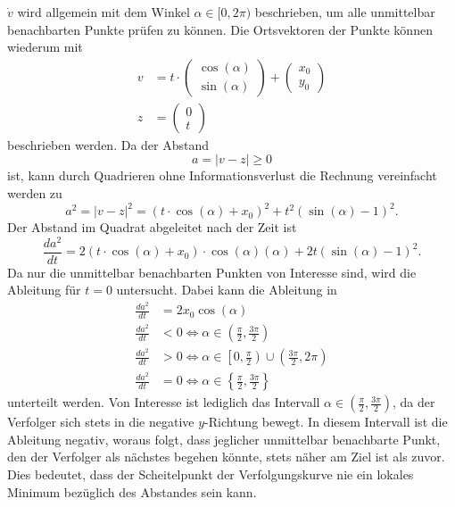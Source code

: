 $\dot{v}$ wird allgemein mit dem Winkel $\alpha \in[ 0, 2\pi)$ beschrieben, um alle unmittelbar benachbarten Punkte prüfen zu können.
Die Ortsvektoren der Punkte können wiederum mit
\begin{align}
	v
	&=
	t\cdot\left(\begin{array}{c} \cos (\alpha) \\ \sin (\alpha) \end{array}\right) +\left(\begin{array}{c} x_0 \\ y_0 \end{array}\right)
	\\
	z
	&=
	\left(\begin{array}{c} 0 \\ t \end{array}\right)
\end{align}
beschrieben werden.
Da der Abstand
\begin{equation}
	a
	=
	|v-z|
	\geq
	0
\end{equation}
ist, kann durch Quadrieren ohne Informationsverlust die Rechnung vereinfacht werden zu
\begin{equation}
	a^2
	=
	|v-z|^2
	=
	(t\cdot\cos(\alpha)+x_0)^2+t^2(\sin(\alpha)-1)^2
	\text{.}
\end{equation}
Der Abstand im Quadrat abgeleitet nach der Zeit ist
\begin{equation}
	\frac{d a^2}{d t}
	=
	2(t\cdot\cos (\alpha)+x_0)\cdot\cos(\alpha)(\alpha)+2t(\sin(\alpha)-1)^2
	\text{.}
\end{equation}
Da nur die unmittelbar benachbarten Punkten von Interesse sind, wird die Ableitung für $t=0$ untersucht. Dabei kann die Ableitung in 
\begin{align}
	\frac{d a^2}{d t}
	&=
	2x_0\cos(\alpha)
	\\
	\frac{d a^2}{d t}
	&<
	0\Leftrightarrow\alpha\in\left( \frac{\pi}{2}, \frac{3\pi}{2}\right)
	\\
	\frac{d a^2}{d t}
	&>
	0\Leftrightarrow\alpha\in\left[0, \frac{\pi}{2}\right)\cup\left(\frac{3\pi}{2}, 2\pi\right)
	\\
	\frac{d a^2}{d t}
	&=
	0\Leftrightarrow\alpha\in\left\{ \frac{\pi}{2}, \frac{3\pi}{2}\right\}
\end{align}
unterteilt werden.
Von Interesse ist lediglich das Intervall $\alpha\in\left( \frac{\pi}{2}, \frac{3\pi}{2}\right)$, da der Verfolger sich stets in die negative $y$-Richtung bewegt.
In diesem Intervall ist die Ableitung negativ, woraus folgt, dass jeglicher unmittelbar benachbarte Punkt, den der Verfolger als nächstes begehen könnte, stets näher am Ziel ist als zuvor.
Dies bedeutet, dass der Scheitelpunkt der Verfolgungskurve nie ein lokales Minimum bezüglich des Abstandes sein kann.
%
